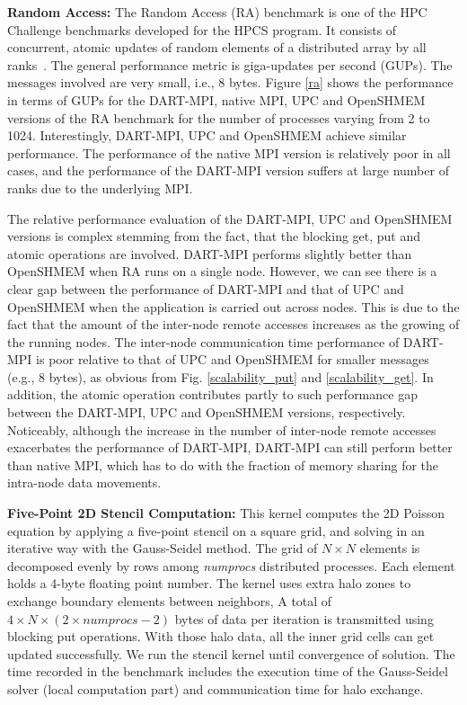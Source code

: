 \documentclass{llncs}
\begin{document}
{\noindent \textbf{Random Access:} The Random Access (RA) benchmark\cite{ra_rule} is one of the HPC
Challenge benchmarks developed for the HPCS program.  
It consists of concurrent, atomic updates of random elements of a
distributed array by all ranks~\cite{shmem_ra}. 
The general performance metric is
giga-updates per second (GUPs). The messages involved are very
small, i.e., 8 bytes.  Figure \ref{ra} shows the performance in terms
of GUPs
for the DART-MPI, native MPI, UPC and OpenSHMEM versions of 
the RA benchmark for
the number of processes varying from 2 to 1024. 
Interestingly, DART-MPI, UPC and OpenSHMEM achieve similar performance.
The performance of the native MPI version is relatively poor in all cases, and the
performance of the DART-MPI version suffers at large number of ranks due to the
underlying MPI.


The relative performance evaluation of the DART-MPI, UPC and OpenSHMEM
versions is complex stemming from the fact, that the blocking get, put
and atomic operations are involved.
\mbox{DART-MPI} performs slightly better than OpenSHMEM when RA runs
on a single node.  However, we can see there is a clear gap
between the performance of \mbox{DART-MPI} and that of UPC and OpenSHMEM when the
application is carried out across nodes. This is due to the fact that
the amount of the \mbox{inter-node} remote accesses increases as
the growing of the running nodes. The \mbox{inter-node}
communication time performance of \mbox{DART-MPI} is poor relative to
that of UPC and OpenSHMEM for smaller messages (e.g., 8 bytes), as
obvious from Fig. \ref{scalability_put} and
\ref{scalability_get}. 
In addition, the atomic operation contributes
partly to such performance gap between the \mbox{DART-MPI}, UPC and
OpenSHMEM versions, respectively. Noticeably, 
although the increase in the number of inter-node remote accesses
exacerbates the performance of DART-MPI, DART-MPI can
still perform better than native MPI, which has to do with the fraction of memory sharing 
for the intra-node data movements.


\noindent \textbf{Five-Point 2D Stencil Computation:} 
This kernel computes the 2D Poisson equation by applying a \mbox{five-point} stencil on a square grid,
and solving in an iterative way with the \mbox{Gauss-Seidel} method. 
The grid of $N \times N$ elements is decomposed evenly by rows among \textit{numprocs} distributed
processes. Each element holds a \mbox{4-byte} floating point number.
The kernel uses extra halo zones to exchange boundary elements between neighbors,
A total of $4 \times N \times (2 \times \textit{numprocs} - 2)$  bytes
of data per iteration is transmitted using blocking put operations. 
With those halo data, all the inner grid cells can get updated
successfully. We run the stencil kernel until convergence of
solution. The time recorded in the benchmark includes the execution
time of the  Gauss-Seidel solver (local computation part) and
communication time for halo exchange.

}
\end{document}
